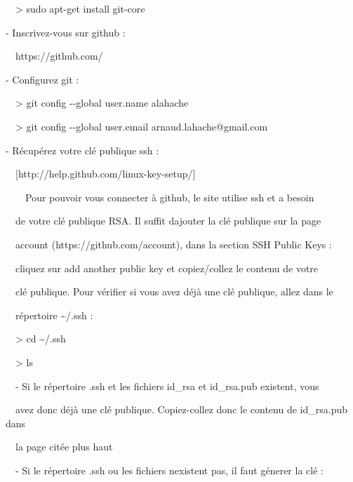 \documentclass{mise_en_page}
\begin{document}
\ \ {\textgreater} sudo apt-get install git-core







{}- Inscrivez-vous sur github :

\ \ https://github.com/







{}- Configurez git :

\ \ {\textgreater} git config -{}-global user.name
{\textquotedbl}alahache{\textquotedbl}

\ \ {\textgreater} git config -{}-global user.email
arnaud.lahache@gmail.com







{}- Récupérez votre clé publique ssh :

\ \ [http://help.github.com/linux-key-setup/]




\ \ \ \ Pour pouvoir vous connecter à github, le site utilise ssh et a
besoin

\ \ de votre clé publique RSA. Il suffit d{\textquotesingle}ajouter la
clé publique sur la page

\ \ {\textquotedbl}account{\textquotedbl} (https://github.com/account),
dans la section {\textquotedbl}SSH Public Keys{\textquotedbl} :

\ \ cliquez sur {\textquotedbl}add another public key{\textquotedbl} et
copiez/collez le contenu de votre

\ \ clé publique. Pour vérifier si vous avez déjà une clé publique,
allez dans le

\ \ répertoire \~{}/.ssh :




\ \ {\textgreater} cd \~{}/.ssh

\ \ {\textgreater} ls




\ \ {}- Si le répertoire .ssh et les fichiers id\_rsa et id\_rsa.pub
existent, vous

\ \ avez donc déjà une clé publique. Copiez-collez donc le contenu de
id\_rsa.pub dans

\ \ la page citée plus haut




\ \ {}- Si le répertoire .ssh ou les fichiers
n{\textquotesingle}existent pas, il faut génerer la clé :
\end{document}
